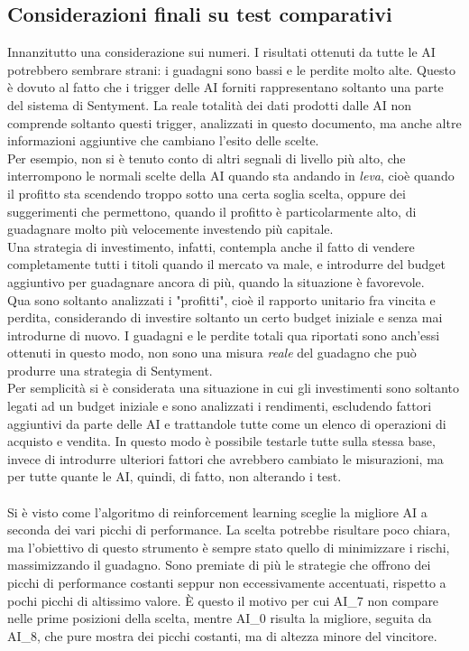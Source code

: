 \documentclass[a4paper,12pt]{report}
\begin{document}
\begin{fig}
\subsection{Considerazioni finali su test comparativi}
Innanzitutto una considerazione sui numeri. I risultati ottenuti da tutte le AI potrebbero sembrare strani: i guadagni sono bassi e le perdite molto alte. Questo è dovuto al fatto che i trigger delle AI forniti rappresentano soltanto una parte del sistema di Sentyment. La reale totalità dei dati prodotti dalle AI non comprende soltanto questi trigger, analizzati in questo documento, ma anche altre informazioni aggiuntive che cambiano l'esito delle scelte.\\Per esempio, non si è tenuto conto di altri segnali di livello più alto, che interrompono le normali scelte della AI quando sta andando in \textit{leva}, cioè quando il profitto sta scendendo troppo sotto una certa soglia scelta, oppure dei suggerimenti che permettono, quando il profitto è particolarmente alto, di guadagnare molto più velocemente investendo più capitale.\\ Una strategia di investimento, infatti, contempla anche il fatto di vendere completamente tutti i titoli quando il mercato va male, e introdurre del budget aggiuntivo per guadagnare ancora di più, quando la situazione è favorevole.\\ Qua sono soltanto analizzati i "profitti", cioè il rapporto unitario fra vincita e perdita, considerando di investire soltanto un certo budget iniziale e senza mai introdurne di nuovo. I guadagni e le perdite totali qua riportati sono anch'essi ottenuti in questo modo, non sono una misura \textit{reale} del guadagno che può produrre una strategia di Sentyment.\\ Per semplicità si è considerata una situazione in cui gli investimenti sono soltanto legati ad un budget iniziale e sono analizzati i rendimenti, escludendo fattori aggiuntivi da parte delle AI e trattandole tutte come un elenco di operazioni di acquisto e vendita. In questo modo è possibile testarle tutte sulla stessa base, invece di introdurre ulteriori fattori che avrebbero cambiato le misurazioni, ma per tutte quante le AI, quindi, di fatto, non alterando i test.\\~\\
Si è visto come l'algoritmo di reinforcement learning sceglie la migliore AI a seconda dei vari picchi di performance. La scelta potrebbe risultare poco chiara, ma l'obiettivo di questo strumento è sempre stato quello di minimizzare i rischi, massimizzando il guadagno. Sono premiate di più le strategie che offrono dei picchi di performance costanti seppur non eccessivamente accentuati, rispetto a pochi picchi di altissimo valore. È questo il motivo per cui AI\_7 non compare nelle prime posizioni della scelta, mentre AI\_0 risulta la migliore, seguita da AI\_8, che pure mostra dei picchi costanti, ma di altezza minore del vincitore.

\end{fig}
\end{document}
